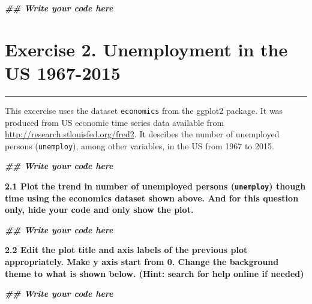 \documentclass[
]{article}
\newenvironment{Shaded}{\begin{snugshade}}{\end{snugshade}}
\newcommand{\DocumentationTok}[1]{\textcolor[rgb]{0.56,0.35,0.01}{\textbf{\textit{#1}}}}
\begin{document}
\begin{Shaded}
\begin{Highlighting}[]
\DocumentationTok{\#\# Write your code here}
\end{Highlighting}
\end{Shaded}

\section{\texorpdfstring{\textbf{Exercise 2. Unemployment in the US
1967-2015}}{Exercise 2. Unemployment in the US 1967-2015}}\label{exercise-2.-unemployment-in-the-us-1967-2015}

\begin{center}\rule{0.5\linewidth}{0.5pt}\end{center}

This excercise uses the dataset \texttt{economics} from the ggplot2
package. It was produced from US economic time series data available
from \url{http://research.stlouisfed.org/fred2}. It descibes the number
of unemployed persons (\texttt{unemploy}), among other variables, in the
US from 1967 to 2015.

\begin{Shaded}
\begin{Highlighting}[]
\DocumentationTok{\#\# Write your code here}
\end{Highlighting}
\end{Shaded}

\textbf{2.1 Plot the trend in number of unemployed persons
(\texttt{unemploy}) though time using the economics dataset shown above.
And for this question only, hide your code and only show the plot.}

\begin{Shaded}
\begin{Highlighting}[]
\DocumentationTok{\#\# Write your code here}
\end{Highlighting}
\end{Shaded}

\textbf{2.2 Edit the plot title and axis labels of the previous plot
appropriately. Make y axis start from 0. Change the background theme to
what is shown below. (Hint: search for help online if needed)}

\begin{Shaded}
\begin{Highlighting}[]
\DocumentationTok{\#\# Write your code here}
\end{Highlighting}
\end{Shaded}
\end{document}

